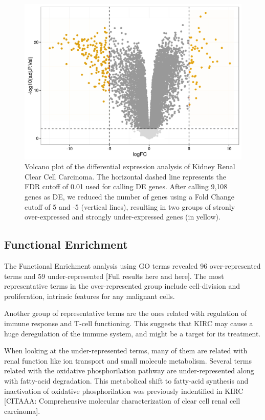 \documentclass[9pt,twocolumn,twoside]{gsajnl}
\begin{document}
\begin{figure}[htbp]
\centering
\includegraphics[width=\linewidth]{figures/fig1_volcano.png}
\caption{Volcano plot of the differential expression analysis of Kidney Renal Clear Cell Carcinoma. The horizontal dashed line represents the FDR cutoff of 0.01 used for calling DE genes. After calling 9,108 genes as DE, we reduced the number of genes using a Fold Change cutoff of 5 and -5 (vertical lines), resulting in two groups of stronly over-expressed and strongly under-expressed genes (in yellow). }%
\label{fig:spectrum}
\end{figure}

\subsection*{Functional Enrichment}
The Functional Enrichment analysis using GO terms revealed 96 over-represented terms and 59 under-represented [Full results here and here]. The most representative terms in the over-represented group include cell-division and proliferation, intrinsic features for any malignant cells. 

Another group of representative terms are the ones related with regulation of immune response and T-cell functioning. This suggests that KIRC may cause a huge deregulation of the immune system, and might be a target for its treatment. 

When looking at the under-represented terms, many of them are related with renal function like ion transport and small molecule metabolism. Several terms related with the oxidative phosphorilation pathway are under-represented along with fatty-acid degradation. This metabolical shift to fatty-acid synthesis and inactivation of oxidative phosphorilation was previously indentified in KIRC [CITAAA: Comprehensive molecular characterization of clear cell renal cell carcinoma].
\end{document}
